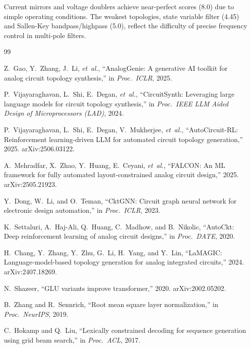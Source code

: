 \documentclass[conference]{IEEEtran}
\begin{document}
Current mirrors and voltage doublers achieve near-perfect scores (8.0)
due to simple operating conditions. The weakest topologies, state variable
filter (4.45) and Sallen-Key bandpass/highpass (5.0), reflect the
difficulty of precise frequency control in multi-pole filters.


% 

\begin{thebibliography}{99}

Z.~Gao, Y.~Zhang, J.~Li, \emph{et~al.},
``{AnalogGenie}: A generative AI toolkit for analog circuit topology
synthesis,'' in \emph{Proc.\ ICLR}, 2025.

P.~Vijayaraghavan, L.~Shi, E.~Degan, \emph{et~al.},
``{CircuitSynth}: Leveraging large language models for circuit topology
synthesis,'' in \emph{Proc.\ IEEE LLM Aided Design of Microprocessors
(LAD)}, 2024.

P.~Vijayaraghavan, L.~Shi, E.~Degan, V.~Mukherjee, \emph{et~al.},
``{AutoCircuit-RL}: Reinforcement learning-driven {LLM} for automated
circuit topology generation,'' 2025. arXiv:2506.03122.

A.~Mehradfar, X.~Zhao, Y.~Huang, E.~Ceyani, \emph{et~al.},
``{FALCON}: An {ML} framework for fully automated layout-constrained
analog circuit design,'' 2025. arXiv:2505.21923.

Y.~Dong, W.~Li, and O.~Teman,
``{CktGNN}: Circuit graph neural network for electronic design
automation,'' in \emph{Proc.\ ICLR}, 2023.

K.~Settaluri, A.~Haj-Ali, Q.~Huang, C.~Madhow, and B.~Nikolic,
``{AutoCkt}: Deep reinforcement learning of analog circuit designs,''
in \emph{Proc.\ DATE}, 2020.

H.~Chang, Y.~Zhang, Y.~Zhu, G.~Li, H.~Yang, and Y.~Lin,
``{LaMAGIC}: Language-model-based topology generation for analog
integrated circuits,'' 2024. arXiv:2407.18269.

N.~Shazeer,
``{GLU} variants improve transformer,'' 2020. arXiv:2002.05202.

B.~Zhang and R.~Sennrich,
``Root mean square layer normalization,'' in \emph{Proc.\ NeurIPS},
2019.

C.~Hokamp and Q.~Liu,
``Lexically constrained decoding for sequence generation using grid
beam search,'' in \emph{Proc.\ ACL}, 2017.


\end{thebibliography}
\end{document}
